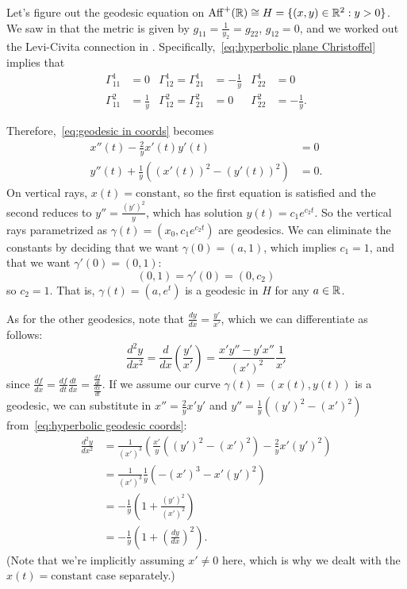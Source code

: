 \begin{example}
	Let's figure out the geodesic equation on $\operatorname{Aff}^+(\mathbb{R}) \cong H = \{(x,y) \in \mathbb{R}^2 : y > 0\}$. We saw in  that the metric is given by $g_{11} = \frac{1}{y_2} = g_{22}$, $g_{12} = 0$, and we worked out the Levi-Civita connection in . Specifically,~\eqref{eq:hyperbolic plane Christoffel} implies that
	\begin{align*}
		\Gamma_{11}^1 & = 0 & \Gamma_{12}^1 = \Gamma_{21}^1 & = -\frac{1}{y} &  \Gamma_{22}^1 & = 0 \\
		\Gamma_{11}^2 & = \frac{1}{y} & \Gamma_{12}^2 = \Gamma_{21}^2 & = 0 & \Gamma_{22}^2 & = -\frac{1}{y}.
	\end{align*}
	
	Therefore,~\eqref{eq:geodesic in coords} becomes
	\begin{align}\label{eq:hyperbolic geodesic coords}
		x''(t) - \frac{2}{y} x'(t)y'(t) & = 0 \\
		y''(t) + \frac{1}{y}((x'(t))^2 - (y'(t))^2) & = 0. \nonumber
	\end{align}
	On vertical rays, $x(t) = \text{constant}$, so the first equation is satisfied and the second reduces to $y''= \frac{(y')^2}{y}$, which has solution $y(t) = c_1 e^{c_2t}$. So the vertical rays parametrized as $\gamma(t) = (x_0,c_1e^{c_2t})$ are geodesics. We can eliminate the constants by deciding that we want $\gamma(0) = (a,1)$, which implies $c_1 = 1$, and that we want $\gamma'(0) = (0,1)$:
	\[
		(0,1) = \gamma'(0) = (0,c_2)
	\]
	so $c_2 = 1$. That is, $\gamma(t) = (a,e^t)$ is a geodesic in $H$ for any $a \in \mathbb{R}$.
	
	As for the other geodesics, note that $\frac{dy}{dx} = \frac{y'}{x'}$, which we can differentiate as follows:
	\[
		\frac{d^2 y}{dx^2} = \frac{d}{dx} \left( \frac{y'}{x'} \right) =\frac{x'y'' - y'x''}{(x')^2} \frac{1}{x'}
	\]
	since $\frac{df}{dx} = \frac{df}{dt} \frac{dt}{dx} = \frac{\frac{df}{dt}}{\frac{dx}{dt}}$. If we assume our curve $\gamma(t) = (x(t),y(t))$ is a geodesic, we can substitute in $x'' = \frac{2}{y} x'y'$ and $y'' = \frac{1}{y} ((y')^2 - (x')^2)$ from~\eqref{eq:hyperbolic geodesic coords}:
	\begin{align*}
		\frac{d^2 y}{dx^2} & = \frac{1}{(x')^3}\left(\frac{x'}{y}((y')^2-(x')^2) - \frac{2}{y}x'(y')^2\right) \\
		& = \frac{1}{(x')^3}\frac{1}{y}\left(-(x')^3 - x'(y')^2\right) \\
		& = -\frac{1}{y} \left(1 + \frac{(y')^2}{(x')^2}\right) \\
		& = -\frac{1}{y} \left(1 + \left( \frac{dy}{dx}\right)^2\right).
	\end{align*}
	(Note that we're implicitly assuming $x' \neq 0$ here, which is why we dealt with the $x(t) = \text{constant}$ case separately.)
	

\end{example}
